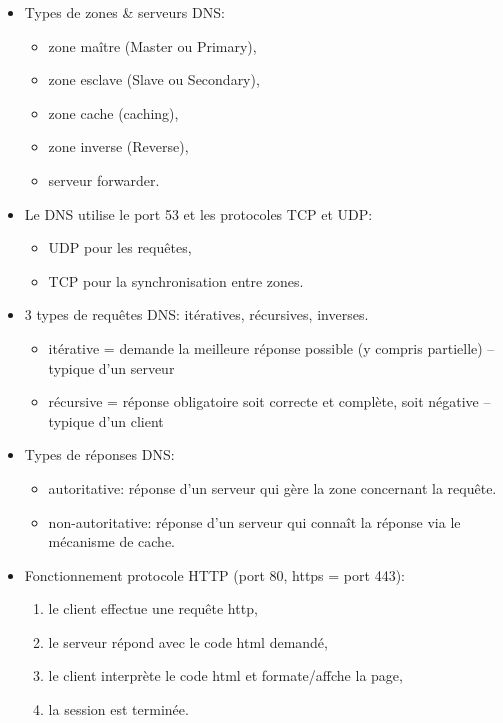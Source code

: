 \documentclass[a4paper]{article}
\begin{document}
\begin{itemize}





\item Types de zones \& serveurs DNS:
\begin{itemize}
    \item zone maître (Master ou Primary),
    \item zone esclave (Slave ou Secondary),
    \item zone cache (caching),
    \item zone inverse (Reverse),
    \item serveur forwarder.
\end{itemize}





\item Le DNS utilise le port 53 et les protocoles TCP et UDP:
\begin{itemize}
    \item UDP pour les requêtes,
    \item TCP pour la synchronisation entre zones.
\end{itemize}





\item 3 types de requêtes DNS: itératives, récursives, inverses.
\begin{itemize}
    \item itérative = demande la meilleure réponse possible (y compris partielle) -- typique d'un serveur
    \item récursive = réponse obligatoire soit correcte et complète, soit négative -- typique d'un client
\end{itemize}





\item Types de réponses DNS:
\begin{itemize}
    \item autoritative: réponse d'un serveur qui gère la zone concernant la requête.
    \item non-autoritative: réponse d'un serveur qui connaît la réponse via le mécanisme de cache.
\end{itemize}





\item Fonctionnement protocole HTTP (port 80, https = port 443):
\begin{enumerate}
    \item le client effectue une requête http,
    \item le serveur répond avec le code html demandé,
    \item le client interprète le code html et formate/affche la page,
    \item la session est terminée.
\end{enumerate}






\end{itemize}
\end{document}
